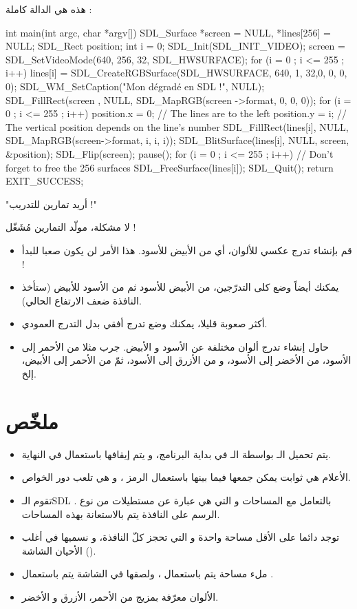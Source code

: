 هذه هي الدالة
كاملة :

\begin{Csource}
int main(int argc, char *argv[])
{
	SDL_Surface *screen = NULL, *lines[256] = {NULL};
	SDL_Rect position;
	int i = 0;
	SDL_Init(SDL_INIT_VIDEO);
	screen = SDL_SetVideoMode(640, 256, 32, SDL_HWSURFACE);
	for (i = 0 ; i <= 255 ; i++)
		lines[i] = SDL_CreateRGBSurface(SDL_HWSURFACE, 640, 1, 32,0, 0, 0, 0);
	SDL_WM_SetCaption("Mon dégradé en SDL !", NULL);
	SDL_FillRect(screen , NULL, SDL_MapRGB(screen ->format, 0, 0, 0));
	for (i = 0 ; i <= 255 ; i++)
	{
		position.x = 0; // The lines are to the left
		position.y = i; // The vertical position depends on the line's number
		SDL_FillRect(lines[i], NULL, SDL_MapRGB(screen->format, i, i, i));
		SDL_BlitSurface(lines[i], NULL, screen, &position);
	}
	SDL_Flip(screen);
	pause();
	for (i = 0 ; i <= 255 ; i++) // Don't forget to free the 256 surfaces
		SDL_FreeSurface(lines[i]);
	SDL_Quit();
	return EXIT_SUCCESS;
}
\end{Csource}

{\large"أريد تمارين للتدريب !"}

لا مشكلة، مولّد التمارين مُشَغّل !

\begin{itemize}
	\item قم بإنشاء تدرج عكسي للألوان، أي من الأبيض للأسود. هذا الأمر لن يكون صعبا للبدأ !
	\item يمكنك أيضاً وضع كلى التدرّجين، من الأبيض للأسود ثم من الأسود للأبيض (ستأخذ النافذة ضعف الارتفاع الحالي).
	\item أكثر صعوبة قليلا، يمكنك وضع تدرج أفقي بدل التدرج العمودي.
	\item حاول إنشاء تدرج ألوان مختلفة عن الأسود و الأبيض. جرب مثلا من الأحمر إلى الأسود، من الأخضر إلى الأسود، و من الأزرق إلى الأسود، ثمّ من الأحمر إلى الأبيض، إلخ.
\end{itemize}

\section*{ملخّص}

\begin{itemize}
	\item يتم تحميل الـ
	بواسطة الـ
	في بداية البرنامج، و يتم إيقافها باستعمال
	في النهاية.
	\item الأعلام هي ثوابت يمكن جمعها فيما بينها باستعمال الرمز 
	\InlineCode{|}،
	 و هي تلعب دور الخواص.
	\item تقوم الـ\textenglish{SDL}
	بالتعامل مع المساحات و التي هي عبارة عن مستطيلات من نوع 
	.
	الرسم على النافذة يتم بالاستعانة بهذه المساحات.
	\item توجد دائما على الأقل مساحة واحدة و التي تحجز كلّ النافذة، و نسميها في أغلب الأحيان الشاشة 
	().
	\item ملء مساحة يتم باستعمال
	،
	ولصقها في الشاشة يتم باستعمال
	.
	\item الألوان معرّفة بمزيج من الأحمر، الأزرق و الأخضر.
\end{itemize}
